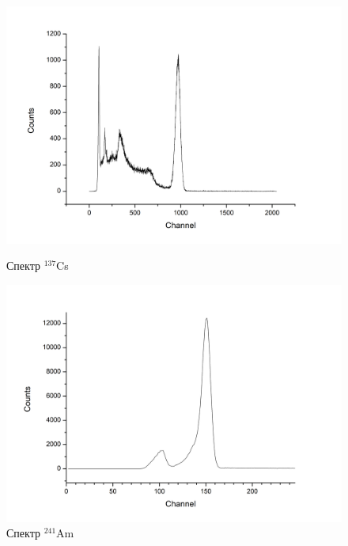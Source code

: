 \documentclass[a4paper]{article}
\begin{document}
\begin{enumerate}
        \begin{figure}[h]
\begin{center}
\begin{minipage}[h]{0.48\linewidth}
\includegraphics[width=1\linewidth]{Cs.png}
\caption{Спектр $^{137}$Cs} %
\end{minipage}
\hfill 
\begin{minipage}[h]{0.48\linewidth}
\includegraphics[width=1\linewidth]{Am.png}
\caption{Спектр $^{241}$Am}
\label{ris:experimcoded}
\end{minipage}
\end{center}
\end{figure}


\end{enumerate}
\end{document}
